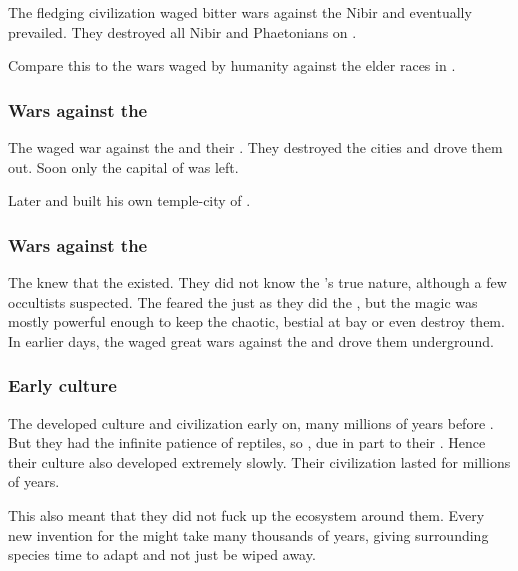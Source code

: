 The fledging \ophidian civilization waged bitter wars against the Nibir and eventually prevailed. 
They destroyed all Nibir and Phaetonians on \Miith. 

Compare this to the wars waged by humanity against the elder races in \cite{RobertEHoward:TheShadowKingdom}. 





\subsubsection[Wars against the Shugul]{Wars against the \moonthings}
The \ophidians waged war against the \shugul \moonthings and their \moongods.
They destroyed the \shugul cities and drove them out.
Soon only the \shugul capital of \Nom was left.

Later  and built his own temple-city of \Baltherium.





\subsubsection{Wars against the \noggyaleth}
The \ophidians knew that the \noggyaleth existed. 
They did not know the \noggyaleth's true nature, although a few occultists suspected.
The \ophidians feared the \noggyaleth just as they did the \xss, but the \ophidian magic was mostly powerful enough to keep the chaotic, bestial \noggyaleth at bay or even destroy them.
In earlier days, the \ophidians waged great wars against the \noggyaleth and drove them underground.





\subsubsection{Early \ophidian culture}
The \ophidians developed culture and civilization early on, many millions of years before \Tiamat. 
But they had the infinite patience of reptiles, so , due in part to their .
Hence their culture also developed extremely slowly. 
Their civilization lasted for millions of years. 

This also meant that they did not fuck up the ecosystem around them. 
Every new invention for the \ophidians{} might take many thousands of years, giving surrounding species time to adapt and not just be wiped away. 

